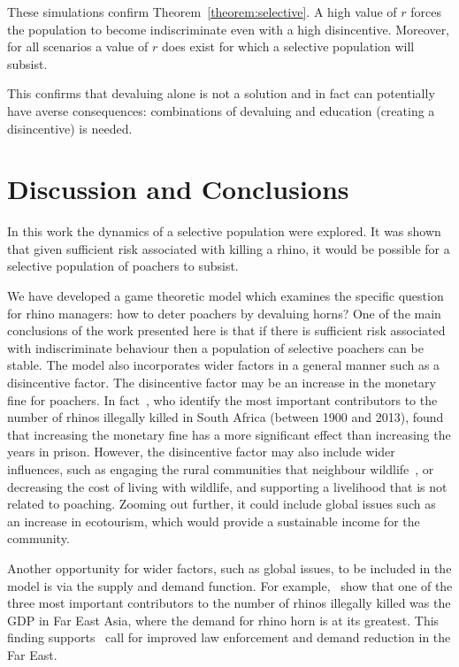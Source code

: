 \documentclass[10pt]{article}
\begin{document}
These simulations confirm Theorem~\ref{theorem:selective}. A high value of \(r\)
forces the population to become indiscriminate even with a high disincentive.
Moreover, for all scenarios a value of \(r\) does exist for which a selective
population will subsist.

This confirms that devaluing alone is not a solution and in fact can
potentially have averse consequences: combinations of devaluing and
education (creating a disincentive) is needed.

\section{Discussion and Conclusions}
\label{section:discussion}

In this work the dynamics of a selective population were explored. It was shown
that given sufficient risk associated with killing a rhino, it would be possible
for a selective population of poachers to subsist.

We have developed a game theoretic model which examines the specific question
for rhino managers: how to deter poachers by devaluing horns?  One of the main
conclusions of the work presented here is that if there is sufficient risk
associated with indiscriminate behaviour then a population of selective poachers
can be stable. The model also incorporates wider factors in a general manner such as
a disincentive factor. The disincentive factor may be an increase in the
monetary fine for poachers. In fact~\cite{di2015identification}, who identify
the most important contributors to the number of rhinos illegally killed in
South Africa (between 1900 and 2013), found that increasing the monetary fine
has a more significant effect than increasing the years in prison. However, the
disincentive factor may also include wider influences, such as engaging the
rural communities that neighbour wildlife~\cite{Duan2013}, or decreasing the
cost of living with wildlife, and supporting a livelihood that is not related to
poaching. Zooming out further, it could include global issues such as an
increase in ecotourism, which would provide a sustainable income for the
community.

Another opportunity for wider factors, such as global issues, to be included in
the model is via the supply and demand function. For example,~\cite{di2015identification}
show that one of the three most important contributors to the number of rhinos illegally
killed was the GDP in Far East Asia, where the demand for rhino horn is at its greatest.
This finding supports~\cite{lawson2014global} call for improved law enforcement and
demand reduction in the Far East.
\end{document}
